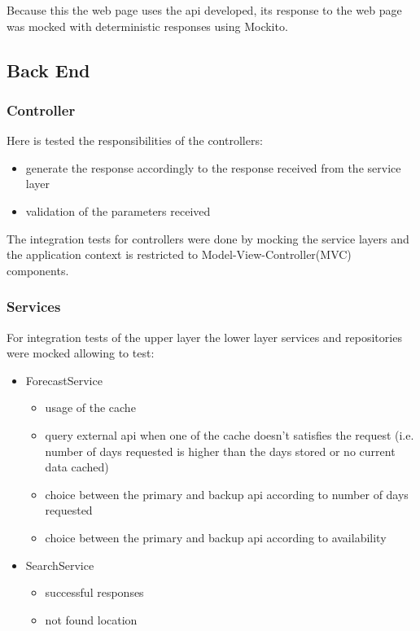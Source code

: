 \documentclass[12pt]{article}
\begin{document}
Because this the web page uses the api developed, its response to the web page
  was mocked with deterministic responses using Mockito.

\subsection{Back End}
\subsubsection{Controller}

Here is tested the responsibilities of the controllers:
\begin{itemize}
  \item generate the response accordingly to the response received from the service layer
  \item validation of the parameters received
\end{itemize}
The integration tests for controllers were done by mocking the service layers and the application
  context is restricted to Model-View-Controller(MVC) components.

\subsubsection{Services}

For integration tests of the upper layer the lower layer services and repositories were mocked allowing
  to test:
\begin{itemize}
  \item ForecastService
    \begin{itemize}
      \item usage of the cache
      \item query external api when one of the cache doesn't satisfies the request (i.e.
        number of days requested is higher than the days stored or no current data
        cached)
      \item choice between the primary and backup api according to number of days requested
      \item choice between the primary and backup api according to availability
    \end{itemize}
  \item SearchService
    \begin{itemize}
      \item successful responses
      \item not found location
    \end{itemize}
\end{itemize}
\end{document}
